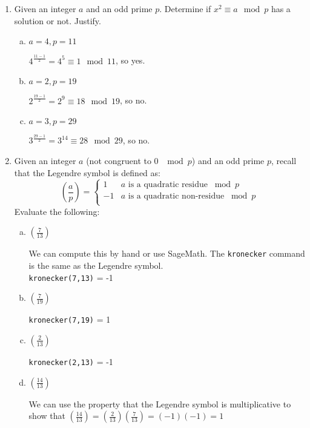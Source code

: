 \documentclass[12pt]{amsart}
\theoremstyle{plain}
\theoremstyle{definition}
\begin{document}
\begin{enumerate}[1.]
	\item Given an integer $a$ and an odd prime $p$.  Determine if $x^2 \equiv a \mod p$ has a solution or not.  Justify.
	\begin{enumerate}[a.]
		\item $a = 4, p = 11$
		\begin{framed}
		$4^{\frac{11-1}{2}} = 4^{5} \equiv 1 \mod 11$, so yes.
		\end{framed}
		\item $a = 2, p = 19$
		\begin{framed}
		$2^{\frac{19-1}{2}} = 2^{9} \equiv 18 \mod 19$, so no.
		\end{framed}
		\item $a = 3, p = 29$
		\begin{framed}
		$3^{\frac{29-1}{2}} = 3^{14} \equiv 28 \mod 29$, so no.
		\end{framed}
	\end{enumerate}
	\item Given an integer $a$ (not congruent to 0 $\mod p$) and an odd prime $p$, recall that the Legendre symbol is defined as: 
	\[ \left( \frac{a}{p}\right) = \begin{cases} 
      1 & a \text{ is a quadratic residue } \bmod p \\
      -1 & a \text{ is a quadratic non-residue } \bmod p \\
   \end{cases}
	\]
	Evaluate the following:
	\begin{enumerate}[a.]
		\item $\left( \frac{7}{13} \right)$
		\begin{framed}
		We can compute this by hand or use SageMath.  The \texttt{kronecker} command is the same as the Legendre symbol.\\
		\texttt{kronecker(7,13)} = -1
		\end{framed}
		\item $\left( \frac{7}{19} \right)$
		\begin{framed}
		\texttt{kronecker(7,19)} = 1
		\end{framed}
		\item $\left( \frac{2}{13} \right)$
		\begin{framed}
		\texttt{kronecker(2,13)} = -1
		\end{framed}
		\item $\left( \frac{14}{13} \right)$
		\begin{framed}
		We can use the property that the Legendre symbol is multiplicative to show that $\left( \frac{14}{13} \right) = \left( \frac{2}{13} \right)\left( \frac{7}{13} \right) = (-1)(-1) = 1$

\end{framed}
\end{enumerate}
\end{enumerate}
\end{document}
